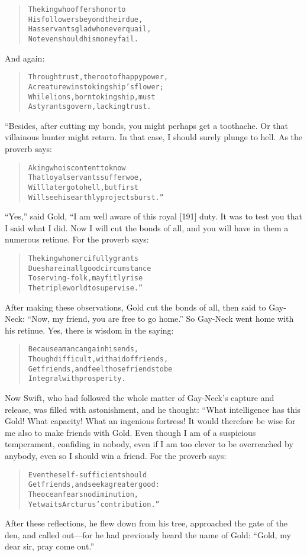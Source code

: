 \documentclass[article, twoside, 14pt]{memoir}
\renewenvironment{verbatim}{%
\begin{quote}%
\vskip -10pt%
\begin{alltt}\normalfont\large}{\end{alltt}%
\end{quote}%
\vskip -10pt
} %
\begin{document}
\begin{verbatim}
The king who offers honor to
His followers beyond their due,
Has servants glad who never quail,
Not even should his money fail.
\end{verbatim}
And again:

\begin{verbatim}
Through trust, the root of happy power,
A creature wins to kingship's flower;
While lions, born to kingship, must
As tyrants govern, lacking trust.
\end{verbatim}
“Besides, after cutting my bonds, you might perhaps get a
toothache. Or that villainous hunter might return. In that case, I
should surely plunge to hell. As the proverb says:

\begin{verbatim}
A king who is content to know
That loyal servants suffer woe,
Will later go to hell, but first
Will see his earthly projects burst.”
\end{verbatim}
``Yes,'' said Gold, “I am well aware of this royal [191] duty. It
was to test you that I said what I did. Now I will cut the bonds of
all, and you will have in them a numerous retinue. For the proverb
says:

\begin{verbatim}
The king who mercifully grants
Due share in all good circumstance
To serving-folk, may fitly rise
The triple world to supervise.”
\end{verbatim}
After making these observations, Gold cut the bonds of all, then
said to Gay-Neck: ``Now, my friend, you are free to go home.'' So
Gay-Neck went home with his retinue. Yes, there is wisdom in the
saying:

\begin{verbatim}
Because a man can gain his ends,
Though difficult, with aid of friends,
Get friends, and feel those friends to be
Integral with prosperity.
\end{verbatim}
Now Swift, who had followed the whole matter of Gay-Neck's capture
and release, was filled with astonishment, and he thought: “What
intelligence has this Gold! What capacity! What an ingenious
fortress! It would therefore be wise for me also to make friends
with Gold. Even though I am of a suspicious temperament, confiding
in nobody, even if I am too clever to be overreached by anybody,
even so I should win a friend. For the proverb says:

\begin{verbatim}
Even the self-sufficient should
Get friends, and seek a greater good:
The ocean fears no diminution,
Yet waits Arcturus' contribution.”
\end{verbatim}
After these reflections, he flew down from his tree, approached the
gate of the den, and called out---for he had previously heard the
name of Gold: ``Gold, my dear sir, pray come out.''
\end{document}
